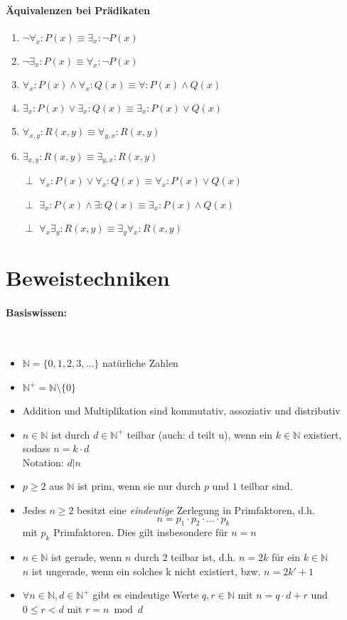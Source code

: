 \paragraph{\"Aquivalenzen bei Pr\"adikaten}
\begin{enumerate}
\item $\neg \forall_x : P(x) \equiv \exists_x: \neg P(x)$
\item $\neg \exists_x : P(x) \equiv \forall_x: \neg P(x)$
\item $\forall_x : P(x) \land \forall_x : Q(x) \equiv \forall : P(x) \land Q(x)$
\item $\exists_x : P(x) \lor \exists_x : Q(x) \equiv \exists_x : P(x) \lor Q(x)$
\item $\forall_{x,y} : R(x,y) \equiv \forall_{y,x} : R(x,y)$
\item $\exists_{x,y} : R(x,y) \equiv \exists_{y,x} : R(x,y)$
\item[$\perp$] $\forall_x : P(x) \lor \forall_x:Q(x) \equiv \forall_x : P(x) \lor Q(x)$
\item[$\perp$] $\exists_x : P(x) \land \exists : Q(x) \equiv \exists_x : P(x) \land Q(x)$
\item[$\perp$] $\forall_x \exists_y : R(x,y) \equiv \exists_y \forall_x : R(x,y)$
\end{enumerate}

\section{Beweistechniken}

\paragraph{Basiswissen:}
\ \\
\begin{itemize}
\item $\mathbb{N} = \{0,1,2,3,\ldots\}$ nat\"urliche Zahlen
\item $\mathbb{N}^{+} = \mathbb{N}\setminus\{0\}$
\item Addition und Multiplikation sind kommutativ, assoziativ und distributiv
\item $n\in\mathbb{N}$ ist durch $d\in\mathbb{N}^+$ teilbar (auch: \glqq d teilt u\grqq ), wenn ein $k\in\mathbb{N}$ existiert, sodass $n=k\cdot d$\\
Notation: $d|n$
\item $p\geq 2$ aus $\mathbb{N}$ ist prim, wenn sie nur durch $p$ und $1$ teilbar sind.
\item Jedes $n\geq 2$ besitzt eine \emph{eindeutige} Zerlegung in Primfaktoren, d.h.
\[
n = p_1 \cdot p_2 \cdot \ldots \cdot p_k
\]
mit $p_k$ Primfaktoren. Dies gilt insbesondere f\"ur $n=n$
\item $n\in\mathbb{N}$ ist gerade, wenn $n$ durch $2$ teilbar ist, d.h. $n=2k$ für ein $k\in\mathbb{N}$\\
$n$ ist ungerade, wenn ein solches k nicht existiert, bzw. $n=2k'+1$
\item $\forall n\in\mathbb{N},d\in\mathbb{N}^{+}$ gibt es eindeutige Werte $q,r\in\mathbb{N}$ mit $n=q\cdot d+r$ und $0\leq r< d$ mit $r=n\bmod d$
\end{itemize}

